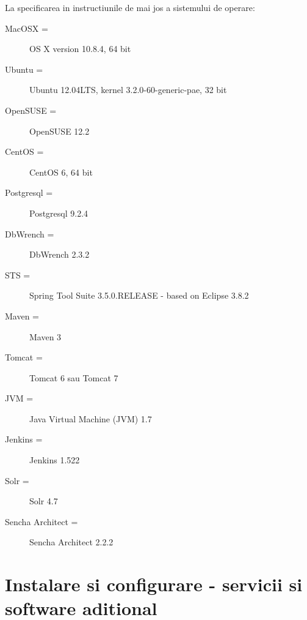 La specificarea in instructiunile de mai jos a sistemului de operare:
\begin{description} 
\item [MacOSX =] OS X version 10.8.4, 64 bit
\item [Ubuntu =] Ubuntu 12.04LTS, kernel 3.2.0-60-generic-pae, 32 bit
\item [OpenSUSE = ] OpenSUSE 12.2
\item [CentOS = ] CentOS 6, 64 bit
\item [Postgresql =] Postgresql 9.2.4
\item [DbWrench =] DbWrench 2.3.2
\item [STS =] Spring Tool Suite 3.5.0.RELEASE - based on Eclipse 3.8.2
\item [Maven =] Maven 3
\item [Tomcat = ] Tomcat 6 sau Tomcat 7
\item [JVM =] Java Virtual Machine (JVM) 1.7
\item [Jenkins =] Jenkins 1.522
\item [Solr =] Solr 4.7
\item [Sencha Architect =] Sencha Architect 2.2.2
\end{description}

\section{Instalare si configurare - servicii si software aditional}

